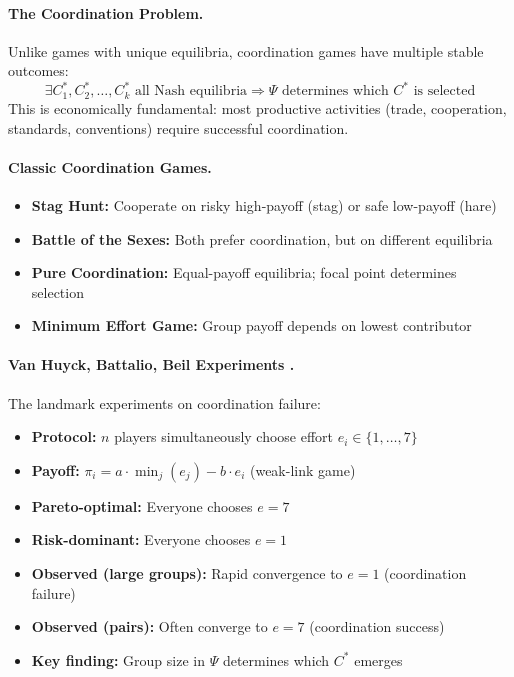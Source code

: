 \paragraph{The Coordination Problem.}
Unlike games with unique equilibria, coordination games have multiple stable outcomes:
\begin{equation}
\exists C^*_1, C^*_2, \ldots, C^*_k \text{ all Nash equilibria} \Rightarrow
\Psi \text{ determines which } C^* \text{ is selected}
\tag{EV-COORD}
\end{equation}
This is economically fundamental: most productive activities (trade, cooperation,
standards, conventions) require successful coordination.

\paragraph{Classic Coordination Games.}
\begin{itemize}[nosep]
    \item \textbf{Stag Hunt:} Cooperate on risky high-payoff (stag) or safe low-payoff (hare)
    \item \textbf{Battle of the Sexes:} Both prefer coordination, but on different equilibria
    \item \textbf{Pure Coordination:} Equal-payoff equilibria; focal point determines selection
    \item \textbf{Minimum Effort Game:} Group payoff depends on lowest contributor
\end{itemize}

\paragraph{Van Huyck, Battalio, Beil Experiments \citep{vanhuyck1990tacit,vanhuyck1991strategic}.}
The landmark experiments on coordination failure:
\begin{itemize}[nosep]
    \item \textbf{Protocol:} $n$ players simultaneously choose effort $e_i \in \{1, \ldots, 7\}$
    \item \textbf{Payoff:} $\pi_i = a \cdot \min_j(e_j) - b \cdot e_i$ (weak-link game)
    \item \textbf{Pareto-optimal:} Everyone chooses $e = 7$
    \item \textbf{Risk-dominant:} Everyone chooses $e = 1$
    \item \textbf{Observed (large groups):} Rapid convergence to $e = 1$ (coordination failure)
    \item \textbf{Observed (pairs):} Often converge to $e = 7$ (coordination success)
    \item \textbf{Key finding:} Group size in $\Psi$ determines which $C^*$ emerges
\end{itemize}

